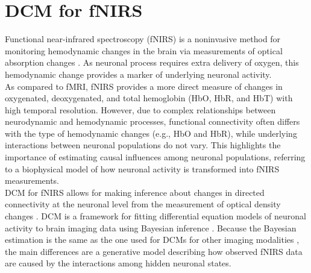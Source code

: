 

\chapter{DCM for fNIRS \label{Chap:data:fnirs}}

Functional near-infrared spectroscopy (fNIRS) is a noninvasive method for monitoring hemodynamic changes in the brain via measurements of optical absorption changes \cite{jobsis1977noninvasive}. As neuronal process requires extra delivery of oxygen, this hemodynamic change provides a marker of underlying neuronal activity. \\

As compared to fMRI, fNIRS provides a more direct measure of changes in oxygenated, deoxygenated, and total hemoglobin (HbO, HbR, and HbT) with high temporal resolution. However, due to complex relationships between neurodynamic and hemodynamic processes, functional connectivity often differs with the type of hemodynamic changes (e.g., HbO and HbR), while underlying interactions between neuronal populations do not vary. This highlights the importance of estimating causal influences among neuronal populations, referring to a biophysical model of how neuronal activity is transformed into fNIRS measurements. \\

DCM for fNIRS allows for making inference about changes in directed connectivity at the neuronal level from the measurement of optical density changes \cite{tak2015dynamic}. DCM is a framework for fitting differential equation models of neuronal activity to brain imaging data using Bayesian inference \cite{Friston2003a, Friston2007a, families}. Because the Bayesian estimation is the same as the one used for DCMs for other imaging modalities \cite{Friston2007a, families}, the main differences are a generative model describing how observed fNIRS data are caused by the interactions among hidden neuronal states. \\

